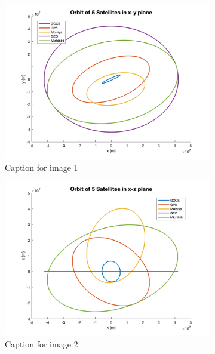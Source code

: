 \documentclass[12pt
,headinclude
,headsepline
,bibtotocnumbered
]{scrartcl}
\begin{document}
\begin{figure}[H]
    \centering
    \begin{subfigure}[b]{0.45\textwidth}
        \includegraphics[width=\textwidth]{plots/orbxy.png}
        \caption{Caption for image 1}
        \label{fig:image1}
    \end{subfigure}
    \begin{subfigure}[b]{0.45\textwidth}
        \includegraphics[width=\textwidth]{plots/orbxz.png}
        \caption{Caption for image 2}
        \label{fig:image2}
    \end{subfigure}
    \begin{subfigure}[b]{0.45\textwidth}

\end{subfigure}
\end{figure}
\end{document}
